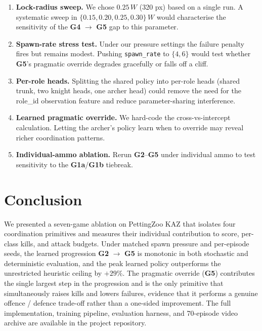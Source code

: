 \documentclass[11pt,a4paper]{article}
\newcommand{\ga}{\textbf{G1a}}
\newcommand{\gb}{\textbf{G1b}}
\newcommand{\gii}{\textbf{G2}}
\newcommand{\giv}{\textbf{G4}}
\newcommand{\gv}{\textbf{G5}}
\begin{document}
\begin{enumerate}[nosep]
\item \textbf{Lock-radius sweep.} We chose $0.25\,W$ (320 px) based on a
  single run. A systematic sweep in $\{0.15, 0.20, 0.25, 0.30\}\,W$
  would characterise the sensitivity of the \giv{} $\to$ \gv{} gap to
  this parameter.
\item \textbf{Spawn-rate stress test.} Under our pressure settings the
  failure penalty fires but remains modest. Pushing \texttt{spawn\_rate}
  to $\{4, 6\}$ would test whether \gv{}'s pragmatic override degrades
  gracefully or falls off a cliff.
\item \textbf{Per-role heads.} Splitting the shared policy into per-role
  heads (shared trunk, two knight heads, one archer head) could remove
  the need for the role\_id observation feature and reduce
  parameter-sharing interference.
\item \textbf{Learned pragmatic override.} We hard-code the
  cross-vs-intercept calculation. Letting the archer's policy learn when
  to override may reveal richer coordination patterns.
\item \textbf{Individual-ammo ablation.} Rerun \gii--\gv{} under
  individual ammo to test sensitivity to the \ga/\gb{} tiebreak.
\end{enumerate}

\section{Conclusion}

We presented a seven-game ablation on PettingZoo KAZ that isolates four
coordination primitives and measures their individual contribution to
score, per-class kills, and attack budgets. Under matched spawn
pressure and per-episode seeds, the learned progression
\gii{} $\to$ \gv{} is monotonic in both stochastic and deterministic
evaluation, and the peak learned policy outperforms the unrestricted
heuristic ceiling by $+29\%$. The pragmatic override (\gv{}) contributes
the single largest step in the progression and is the only primitive
that simultaneously raises kills and lowers failures, evidence that it
performs a genuine offence / defence trade-off rather than a one-sided
improvement. The full implementation, training pipeline, evaluation
harness, and 70-episode video archive are available in the project
repository.



\end{document}
